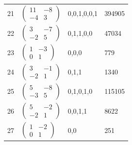 \begin{center}
\begin{longtable}{rlll}
21 & $\left(\begin{smallmatrix}11&-8\\-4&3\end{smallmatrix}\right)$ & 0,0,1,0,0,1 & 394905\\
22 & $\left(\begin{smallmatrix}3&-7\\-2&5\end{smallmatrix}\right)$ & 0,1,1,0,0 & 47034\\
23 & $\left(\begin{smallmatrix}1&-3\\0&1\end{smallmatrix}\right)$ & 0,0,0 & 779\\
24 & $\left(\begin{smallmatrix}3&-1\\-2&1\end{smallmatrix}\right)$ & 0,1,1 & 1340\\
25 & $\left(\begin{smallmatrix}5&-8\\-3&5\end{smallmatrix}\right)$ & 0,1,0,1,0 & 115105\\
26 & $\left(\begin{smallmatrix}5&-2\\-2&1\end{smallmatrix}\right)$ & 0,0,1,1 & 8622\\
27 & $\left(\begin{smallmatrix}1&-2\\0&1\end{smallmatrix}\right)$ & 0,0 & 251\\
\end{longtable}
\end{center}
